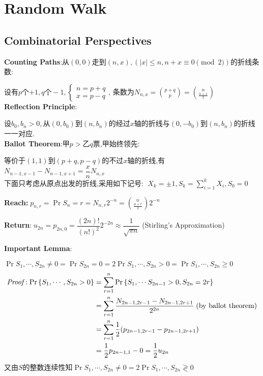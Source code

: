 
\section{Random Walk}
\subsection{Combinatorial Perspectives}
\label{sec:walk}
\textbf{Counting Paths}:从$ (0,0)走到 (n,x),(|x|\le n, n + x\equiv 0 \pmod 2)$的折线条数:

  设有$ p$个$ +1,q个-1,\begin{cases}n=p+q\\x=p-q \end{cases}$,
  条数为$ N_{n,x} = {{p+q}\choose{p}} = {{n}\choose{\frac{n+x}{2}}} $
  \\

  \textbf{Reflection Principle}:

  设$ b_0,b_n>0,从(0,b_0)到(n,b_n)$的经过$ x$轴的折线与$(0,-b_0)$到$(n,b_n)$的折线一一对应.
  \\

  \textbf{Ballot Theorem}:甲$ p>$乙$ q$票,甲始终领先:

  等价于$ (1,1)$到$ (p+q,p-q)$的不过$ x$轴的折线,有$ N_{n-1,x-1} -
  N_{n-1,x+1}=\dfrac{x}{n}N_{n,x}$
  \\

  下面只考虑从原点出发的折线,采用如下记号:
  $\; X_k = \pm 1, S_k = \sum_{i=1}^k{X_i},S_0=0$

  \textbf{Reach:}$\; p_{n,r} = \Pr{S_n=r} = N_{n,r}2^{-n} = {{n}\choose{\frac{n+r}{2}}} 2^{-n}$

  \textbf{Return}:$\; u_{2n} = p_{2n,0} = \dfrac{(2n)!}{(n!)^2}2^{-2n}\approx \dfrac{1}{\sqrt{\pi n}}$ (Stirling's Approximation)
  \vspace{0.6cm}

  \textbf{Important Lemma}:

  $ \Pr{S_1,\cdots ,S_{2n}\neq 0} = \Pr{S_{2n}=0}=2\Pr{S_1,\cdots ,S_{2n}>0} =
    \Pr{S_1,\cdots ,S_{2n}\ge 0}$
\begin{align*}
  \proof:
   \Pr{S_1,\cdots ,S_{2n}>0} &= \sum_{r=1}^{n}{\Pr{S_1 ,\cdots S_{2n-1}>0,S_{2n}=2r}}\\
   &=\sum_{r=1}^{n}{\dfrac{N_{2n-1,2r-1}-N_{2n-1,2r+1}}{2^{2n}}} \; \text{(by ballot theorem)}\\
   &=\sum_{r=1}^n{\dfrac{1}{2}(p_{2n-1,2r-1}-p_{2n-1,2r+1})} \\
   &=\dfrac{1}{2}p_{2n-1,1}-0 = \dfrac{1}{2}u_{2n}
\end{align*}
又由$ S$的整数连续性知$ \Pr{S_1,\cdots ,S_{2n}\neq0}=2\Pr{S_1,\cdots ,S_{2n}\gtrless 0}$

